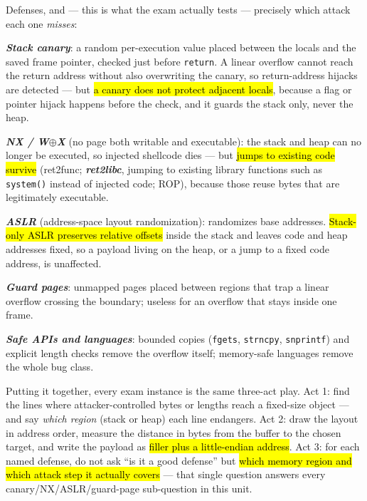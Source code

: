 \documentclass[12pt, a4paper]{article}
\newcommand{\term}[1]{\textbf{\textit{#1}}}        %
\newcommand{\imp}[1]{\hl{#1}}                       %
\begin{document}
Defenses, and --- this is what the exam actually tests --- precisely which attack each one \emph{misses}: \begin{tightitem} \item \term{Stack canary}: a random per-execution value placed between the locals and the saved frame pointer, checked just before \texttt{return}. A linear overflow cannot reach the return address without also overwriting the canary, so return-address hijacks are detected --- but \imp{a canary does not protect adjacent locals}, because a flag or pointer hijack happens before the check, and it guards the stack only, never the heap. \item \term{NX / W$\oplus$X} (no page both writable and executable): the stack and heap can no longer be executed, so injected shellcode dies --- but \imp{jumps to existing code survive} (ret2func; \term{ret2libc}, jumping to existing library functions such as \texttt{system()} instead of injected code; ROP), because those reuse bytes that are legitimately executable. \item \term{ASLR} (address-space layout randomization): randomizes base addresses. \imp{Stack-only ASLR preserves relative offsets} inside the stack and leaves code and heap addresses fixed, so a payload living on the heap, or a jump to a fixed code address, is unaffected. \item \term{Guard pages}: unmapped pages placed between regions that trap a linear overflow crossing the boundary; useless for an overflow that stays inside one frame. \item \term{Safe APIs and languages}: bounded copies (\texttt{fgets}, \texttt{strncpy}, \texttt{snprintf}) and explicit length checks remove the overflow itself; memory-safe languages remove the whole bug class. \end{tightitem}

Putting it together, every exam instance is the same three-act play. Act 1: find the lines where attacker-controlled bytes or lengths reach a fixed-size object --- and say \emph{which region} (stack or heap) each line endangers. Act 2: draw the layout in address order, measure the distance in bytes from the buffer to the chosen target, and write the payload as \imp{filler plus a little-endian address}. Act 3: for each named defense, do not ask ``is it a good defense'' but \imp{which memory region and which attack step it actually covers} --- that single question answers every canary/NX/ASLR/guard-page sub-question in this unit.
\end{document}
